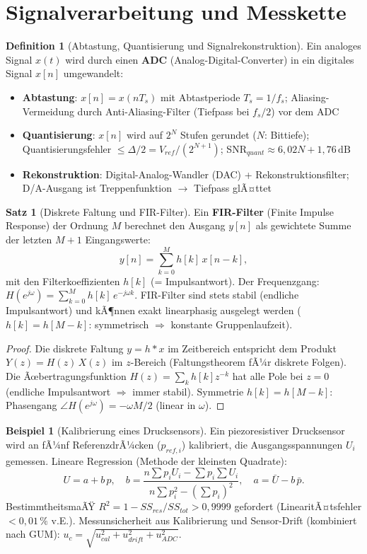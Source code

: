 ﻿\documentclass[a4paper,12pt]{report}
\theoremstyle{definition}
\newtheorem{definition}{Definition}
\newtheorem{beispiel}{Beispiel}
\newtheorem{satz}{Satz}
\begin{document}
\section{Signalverarbeitung und Messkette}

\begin{definition}[Abtastung, Quantisierung und Signalrekonstruktion]
Ein analoges Signal $x(t)$ wird durch einen \textbf{ADC} (Analog-Digital-Converter)
in ein digitales Signal $x[n]$ umgewandelt:
\begin{itemize}
    \item[-] \textbf{Abtastung}: $x[n] = x(nT_s)$ mit Abtastperiode $T_s = 1/f_s$;
          Aliasing-Vermeidung durch Anti-Aliasing-Filter (Tiefpass bei $f_s/2$) vor dem ADC
    \item[-] \textbf{Quantisierung}: $x[n]$ wird auf $2^N$ Stufen gerundet
          ($N$: Bittiefe); Quantisierungsfehler $\le \Delta/2 = V_{ref}/(2^{N+1})$;
          SNR$_{quant} \approx 6{,}02N + 1{,}76\,\mathrm{dB}$
    \item[-] \textbf{Rekonstruktion}: Digital-Analog-Wandler (DAC) + Rekonstruktionsfilter;
          D/A-Ausgang ist Treppenfunktion $\to$ Tiefpass glÃ¤ttet
\end{itemize}
\end{definition}

\begin{satz}[Diskrete Faltung und FIR-Filter]
Ein \textbf{FIR-Filter} (Finite Impulse Response) der Ordnung $M$
berechnet den Ausgang $y[n]$ als gewichtete Summe der letzten $M+1$ Eingangswerte:
\[
  y[n] = \sum_{k=0}^{M} h[k]\,x[n-k],
\]
mit den Filterkoeffizienten $h[k]$ (= Impulsantwort).
Der Frequenzgang: $H(e^{j\omega}) = \sum_{k=0}^M h[k]\,e^{-j\omega k}$.
FIR-Filter sind stets stabil (endliche Impulsantwort) und kÃ¶nnen
exakt linearphasig ausgelegt werden ($h[k] = h[M-k]$:
symmetrisch $\Rightarrow$ konstante Gruppenlaufzeit).
\end{satz}
\begin{proof}
Die diskrete Faltung $y = h * x$ im Zeitbereich entspricht dem Produkt
$Y(z) = H(z)\,X(z)$ im $z$-Bereich (Faltungstheorem fÃ¼r diskrete Folgen).
Die Ãœbertragungsfunktion $H(z) = \sum_k h[k] z^{-k}$ hat alle Pole bei $z=0$
(endliche Impulsantwort $\Rightarrow$ immer stabil).
Symmetrie $h[k] = h[M-k]$: Phasengang $\angle H(e^{j\omega}) = -\omega M/2$ (linear in $\omega$).
\end{proof}

\begin{beispiel}[Kalibrierung eines Drucksensors]
Ein piezoresistiver Drucksensor wird an fÃ¼nf ReferenzdrÃ¼cken ($p_{ref,i}$)
kalibriert, die Ausgangsspannungen $U_i$ gemessen.
Lineare Regression (Methode der kleinsten Quadrate):
\[
  U = a + b\,p, \quad
  b = \frac{n\sum p_i U_i - \sum p_i\sum U_i}{n\sum p_i^2 - (\sum p_i)^2}, \quad
  a = \bar{U} - b\,\bar{p}.
\]
BestimmtheitsmaÃŸ $R^2 = 1 - SS_{res}/SS_{tot} > 0{,}9999$ gefordert
(LinearitÃ¤tsfehler $< 0{,}01\,\%$ v.E.).
Messunsicherheit aus Kalibrierung und Sensor-Drift
(kombiniert nach GUM): $u_c = \sqrt{u_{cal}^2 + u_{drift}^2 + u_{ADC}^2}$.
\end{beispiel}
\end{document}
